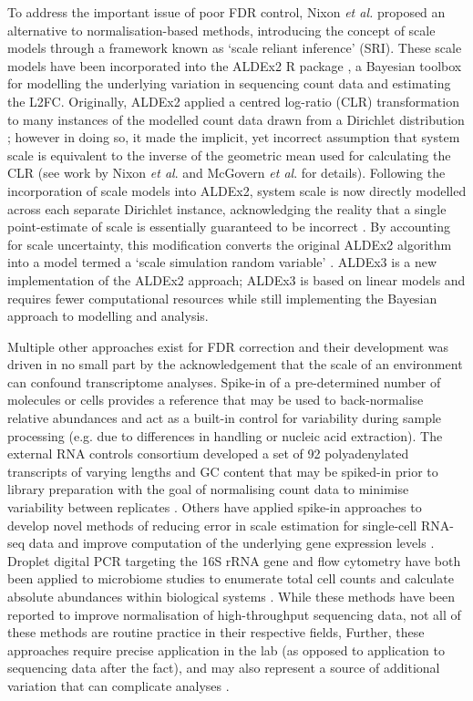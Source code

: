 \documentclass[10pt,letterpaper]{article}
\begin{document}
To address the important issue of poor FDR control, Nixon \textit{et al.} \cite{nixon_scale_2024} proposed an alternative to normalisation-based methods, introducing the concept of scale models through a framework known as `scale reliant inference' (SRI). These scale models have been incorporated into the ALDEx2 R package \cite{gloor_explicit_2025}, a Bayesian toolbox for modelling the underlying variation in sequencing count data and estimating the L2FC. Originally, ALDEx2 applied a centred log-ratio (CLR) transformation to many instances of the modelled count data drawn from a Dirichlet distribution \cite{fernandes:2014}; however in doing so, it made the implicit, yet incorrect assumption that system scale is equivalent to the inverse of the geometric mean used for calculating the CLR (see work by Nixon \textit{et al}. \cite{nixon_scale_2024} and McGovern \textit{et al}. \cite{mcgovern_addressing_2023} for details). Following the incorporation of scale models into ALDEx2, system scale is now directly modelled across each separate Dirichlet instance, acknowledging the reality that a single point-estimate of scale is essentially guaranteed to be incorrect \cite{gloor_explicit_2025}. By accounting for scale uncertainty, this modification converts the original ALDEx2 algorithm into a model termed a `scale simulation random variable' \cite{nixon_scale_2024}. ALDEx3 is a new implementation of the ALDEx2 approach; ALDEx3 is based on linear models and requires fewer computational resources while still implementing the Bayesian approach to modelling and analysis.

Multiple other approaches exist for FDR correction and their development was driven in no small part by the acknowledgement that the scale of an environment can confound transcriptome analyses. Spike-in of a pre-determined number of molecules or cells provides a reference that may be used to back-normalise relative abundances and act as a built-in control for variability during sample processing \cite{rao_multi-kingdom_2021} (e.g. due to differences in handling or nucleic acid extraction). The external RNA controls consortium developed a set of 92 polyadenylated transcripts of varying lengths and GC content that may be spiked-in prior to library preparation with the goal of normalising count data to minimise variability between replicates \cite{baker_external_2005}. Others have applied spike-in approaches to develop novel methods of reducing error in scale estimation for single-cell RNA-seq data and improve computation of the underlying gene expression levels \cite{ding_normalization_2015}. Droplet digital PCR targeting the 16S rRNA gene and flow cytometry have both been applied to microbiome studies to enumerate total cell counts and calculate absolute abundances within biological systems \cite{lin_towards_2019, barlow_quantitative_2020}. While these methods have been reported to improve normalisation of high-throughput sequencing data, not all of these methods are routine practice in their respective fields, Further, these approaches require precise application in the lab (as opposed to application to sequencing data after the fact), and may also represent a source of additional variation that can complicate analyses \cite{risso_normalization_2014}.
\end{document}
